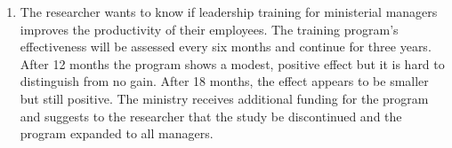 \documentclass[12pt,a4]{article}
\begin{document}
\begin{enumerate}
\item The researcher wants to know if leadership training for ministerial managers improves the productivity of their employees. The training program's effectiveness will be assessed every six months and continue for three years. After 12 months the program shows a modest, positive effect but it is hard to distinguish from no gain. After 18 months, the effect appears to be smaller but still positive. The ministry receives additional funding for the program and suggests to the researcher that the study be discontinued and the program expanded to all managers. %

\end{enumerate}
\end{document}
